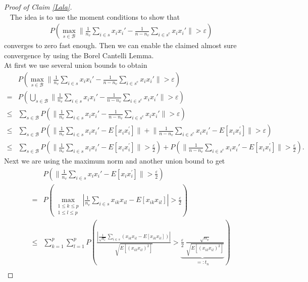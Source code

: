 \documentclass[Research_Module_ES.tex]{subfiles}
\begin{document}
\begin{proof}[Proof of Claim \ref{Lala}]~\\~
 The idea is to use the moment conditions to show that 
 \begin{align*}
 P\left( \max_{s\in \mathcal{B}}\biggl\lVert \frac{1}{n_v}\sum_{i\in s}x_ix_i' - \frac{1}{n-n_v}\sum_{i\in s^c}x_ix_i'\biggr\rVert>\varepsilon\right)
 \end{align*}
 converges to zero fast enough.
Then we can enable the claimed almost sure convergence by using the Borel Cantelli Lemma.\\

At first we use several union bounds to obtain
\begin{align}\nonumber
&P\left( \max_{s\in \mathcal{B}}\biggl\lVert \frac{1}{n_v}\sum_{i\in s}x_ix_i' - \frac{1}{n-n_v}\sum_{i\in s^c}x_ix_i'\biggr\rVert>\varepsilon\right)\\\nonumber
=&P\left( \bigcup_{s\in \mathcal{B}}\biggl\lVert \frac{1}{n_v}\sum_{i\in s}x_ix_i' - \frac{1}{n-n_v}\sum_{i\in s^c}x_ix_i'\biggr\rVert>\varepsilon\right)\\\nonumber
\leq&\sum_{s\in \mathcal{B}}P\left(\biggl\lVert \frac{1}{n_v}\sum_{i\in s}x_ix_i' - \frac{1}{n-n_v}\sum_{i\in s^c}x_ix_i'\biggr\rVert>\varepsilon\right)\\\nonumber
\leq&\sum_{s\in \mathcal{B}}P\left(\biggl\lVert \frac{1}{n_v}\sum_{i\in s}x_ix_i'-E[x_i x_i^\prime]\biggr\rVert+\biggl\lVert \frac{1}{n-n_v}\sum_{i\in s^c}x_ix_i'-E[x_i x_i^\prime]\biggr\rVert>\varepsilon\right)\\
\leq&\sum_{s\in \mathcal{B}}P\left(\biggl\lVert \frac{1}{n_v}\sum_{i\in s}x_ix_i'-E[x_i x_i^\prime]\biggr\rVert>\frac{\varepsilon}{2}\right)+P\left(\biggl\lVert \frac{1}{n-n_v}\sum_{i\in s^c}x_ix_i'-E[x_i x_i^\prime]\biggr\rVert>\frac{\varepsilon}{2}\right).\label{Viereck}
\end{align}
Next we are using the maximum norm and another union bound to get
\begin{align}\nonumber
&P\left(\biggl\lVert \frac{1}{n_v}\sum_{i\in s}x_ix_i'-E[x_i x_i^\prime]\biggr\rVert>\frac{\varepsilon}{2}\right)\\\nonumber
=&P\left(\max_{\substack{1\leq k \leq p \\1\leq l\leq p}}\left| \frac{1}{n_v}\sum_{i\in s}x_{ik}x_{il}-E[x_{ik} x_{il}]\right|>\frac{\varepsilon}{2}\right)\\\nonumber
\leq& \sum_{k=1}^{p}\sum_{l=1}^{p}P\left( \frac{\left|\frac{1}{\sqrt{n_v}}\sum_{i\in s}\left(x_{ik}x_{il}-E[x_{ik}x_{il}]\right)\right|}{\sqrt{E[(x_{ik}x_{il})^2]}}>\underbrace{\frac{\varepsilon}{2}~ \frac{\sqrt{n_v}}{\sqrt{E[(x_{ik}x_{il})^2]}}}_{=:t_n}\right)\\

\end{align}
\end{proof}
\end{document}
